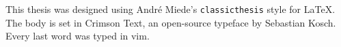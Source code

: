 This thesis was designed using Andr\'e Miede's
\texttt{classicthesis} style for \LaTeX.
The body is set in Crimson Text, an open-source typeface by Sebastian Kosch.
Every last word was typed in vim.
